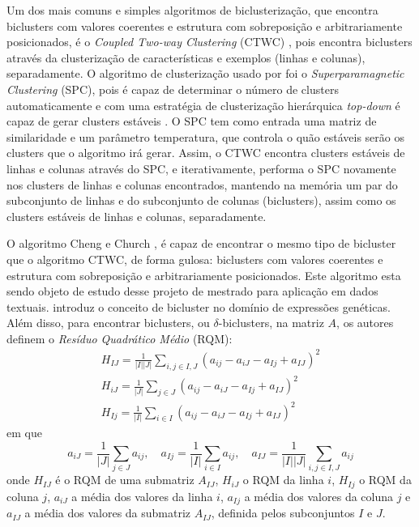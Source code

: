 \documentclass[normaltoc, espacoumemeio, pnumromarab,ruledheader]{abnt}
\begin{document}
    Um dos mais comuns e simples algoritmos de biclusterização, que encontra biclusters com valores coerentes e estrutura com sobreposição e arbitrariamente posicionados, é o \textit{Coupled Two-way Clustering} (CTWC) \cite{Getz2000}, pois encontra biclusters através da clusterização de características e exemplos (linhas e colunas), separadamente.
    O algoritmo de clusterização usado por \cite{Getz2000} foi o \textit{Superparamagnetic Clustering} (SPC), pois é capaz de determinar o número de clusters automaticamente e com uma estratégia de clusterização hierárquica \textit{top-down} é capaz de gerar clusters estáveis \cite{Getz2000}.
    O SPC tem como entrada uma matriz de similaridade e um parâmetro temperatura, que controla o quão estáveis serão os clusters que o algoritmo irá gerar.
    Assim, o CTWC encontra clusters estáveis de linhas e colunas através do SPC, e iterativamente, performa o SPC novamente nos clusters de linhas e colunas encontrados, mantendo na memória um par do subconjunto de linhas e do subconjunto de colunas (biclusters), assim como os clusters estáveis de linhas e colunas, separadamente.

    O algoritmo Cheng e Church \cite{Cheng2000}, é capaz de encontrar o mesmo tipo de bicluster que o algoritmo CTWC, de forma gulosa: biclusters com valores coerentes e estrutura com sobreposição e arbitrariamente posicionados. Este algoritmo esta sendo objeto de estudo desse projeto de mestrado para aplicação em dados textuais.
     introduz o conceito de bicluster no domínio de expressões genéticas. Além disso, para encontrar biclusters, ou $\delta$-biclusters, na matriz $A$, os autores definem o \textit{Resíduo Quadrático Médio} (RQM):
    \begin{equation}
    \begin{split}
        H_{IJ} = \frac{1}{|I||J|} \displaystyle\sum_{i,j \in I,J} (a_{ij} - a_{iJ} - a_{Ij} + a_{IJ})^2 \\
        H_{iJ} = \frac{1}{|J|} \displaystyle\sum_{j \in J} (a_{ij} - a_{iJ} - a_{Ij} + a_{IJ})^2 \\
        H_{Ij} = \frac{1}{|I|} \displaystyle\sum_{i \in I} (a_{ij} - a_{iJ} - a_{Ij} + a_{IJ})^2
    \end{split}
    \end{equation}
    em que
    \begin{equation}
        a_{iJ} = \frac{1}{|J|} \displaystyle\sum_{j \in J} a_{ij},\quad a_{Ij} = \frac{1}{|I|} \displaystyle\sum_{i \in I} a_{ij},\quad a_{IJ} = \frac{1}{|I||J|} \displaystyle\sum_{i,j \in I,J} a_{ij}
    \end{equation}
    onde $H_{IJ}$ é o RQM de uma submatriz $A_{IJ}$, $H_{iJ}$ o RQM da linha $i$, $H_{Ij}$ o RQM da coluna $j$, $a_{iJ}$ a média dos valores da linha $i$, $a_{Ij}$ a média dos valores da coluna $j$ e $a_{IJ}$ a média dos valores da submatriz $A_{IJ}$, definida pelos subconjuntos $I$ e $J$.
\end{document}

